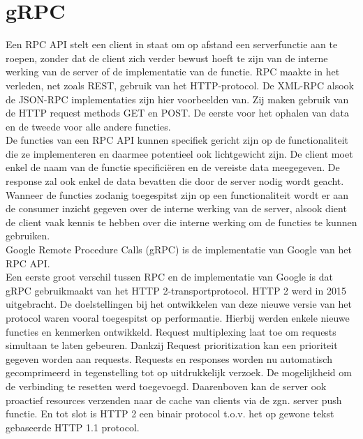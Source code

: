 \section{gRPC}

Een RPC API stelt een client in staat om op afstand een serverfunctie aan te roepen, zonder dat de client zich verder bewust hoeft te zijn van de interne werking
van de server of de implementatie van de functie.
RPC maakte in het verleden, net zoals REST, gebruik van het HTTP-protocol. De XML-RPC alsook de JSON-RPC implementaties zijn hier voorbeelden van.
Zij maken gebruik van de HTTP request methods GET en POST. De eerste voor het ophalen van data en de tweede voor alle andere functies.\\

De functies van een RPC API kunnen specifiek gericht zijn op de functionaliteit die ze implementeren en daarmee potentieel ook lichtgewicht zijn.
De client moet enkel de naam van de functie specifici\"eren en de vereiste data meegegeven. De response zal ook enkel de data bevatten die door de server nodig wordt geacht.
Wanneer de functies zodanig toegespitst zijn op een functionaliteit wordt er aan de consumer inzicht gegeven over de interne werking van de server,
alsook dient de client vaak kennis te hebben over die interne werking om de functies te kunnen gebruiken.\newline
~\autocite{altexsoft}\\

Google Remote Procedure Calls (gRPC) is de implementatie van Google van het RPC API.\\
Een eerste groot verschil tussen RPC en de implementatie van Google is dat gRPC gebruikmaakt van het HTTP 2-transportprotocol.
HTTP 2 werd in 2015 uitgebracht. De doelstellingen bij het ontwikkelen van deze nieuwe versie van het protocol waren vooral toegespitst op performantie.
Hierbij werden enkele nieuwe functies en kenmerken ontwikkeld. Request multiplexing laat toe om requests simultaan te laten gebeuren.
Dankzij Request prioritization kan een prioriteit gegeven worden aan requests. Requests en responses worden nu automatisch gecomprimeerd in tegenstelling tot op
uitdrukkelijk verzoek. De mogelijkheid om de verbinding te resetten werd toegevoegd. Daarenboven kan de server ook proactief resources verzenden naar de
cache van clients via de zgn. server push functie. En tot slot is HTTP 2 een binair protocol t.o.v. het op gewone tekst gebaseerde HTTP 1.1 protocol.\newline
~\autocite{baeldung}\\


